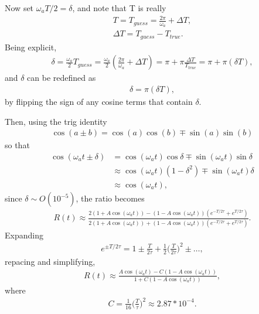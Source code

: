 Now set $\omega_{a}T/2 = \delta$, and note that T is really
	\begin{equation}
	\begin{aligned}
 		T = T_{guess} = \frac{2\pi}{\omega_{a}} + \Delta T, \\
 		\Delta T = T_{guess} - T_{true}.
	\end{aligned}
	\end{equation}
Being explicit, 
	\begin{align}
		\delta = \frac{\omega_{a}}{2} T_{guess} = \frac{\omega_{a}}{2} (\frac{2\pi}{\omega_{a}} + \Delta T) = \pi + \pi \frac{\Delta T}{T_{true}} = \pi + \pi (\delta T),
	\end{align}
and $\delta$ can be redefined as 
	\begin{align}
		\delta = \pi (\delta T),
	\end{align}
by flipping the sign of any cosine terms that contain $\delta$.

Then, using the trig identity 
	\begin{align}
		\cos(a \pm b) = \cos(a)\cos(b) \mp \sin(a)\sin(b)
	\end{align}
so that 
	\begin{equation}
	\begin{aligned}
		\cos(\omega_{a}t \pm \delta) &= \cos(\omega_{a}t)\cos{\delta} \mp \sin(\omega_{a}t)\sin{\delta} \\
		&\approx \cos(\omega_{a}t)(1-\delta^{2}) \mp \sin(\omega_{a}t)\delta \\
		&\approx \cos(\omega_{a}t),
	\label{eqn:trig}
	\end{aligned}
	\end{equation}
since $\delta \sim O(10^{-5})$, the ratio becomes
	\begin{align}
		R(t) \approx \frac{2(1 + A \cos(\omega_{a}t)) - (1 - A \cos(\omega_{a}t))(e^{-T/ 2\tau} + e^{T/ 2\tau})} {2(1 + A \cos(\omega_{a}t)) + (1 - A \cos(\omega_{a}t))(e^{-T/ 2\tau} + e^{T/ 2\tau})}.
	\end{align}
Expanding
	\begin{align}
		e^{\pm T/ 2\tau} = 1 \pm \frac{T}{2\tau} + \frac{1}{2} \Big(\frac{T}{2\tau}\Big)^{2} \pm \dots,
	\end{align}
repacing and simplifying,
	\begin{align}
		R(t) \approx \frac{A \cos(\omega_{a}t) - C (1 - A \cos(\omega_{a}t))}{1 + C (1 - A \cos(\omega_{a}t))},
	\end{align}
where
	\begin{align}
		C = \frac{1}{16} \Big(\frac{T}{\tau}\Big)^{2} \approx 2.87 * 10^{-4}.
	\end{align}


